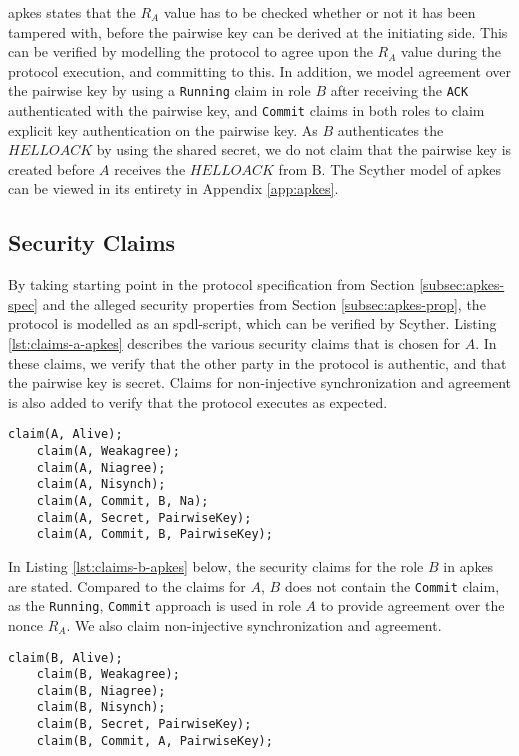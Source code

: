 \gls{apkes} states that the $R_A$ value has to be checked whether or not it has been tampered with, before the pairwise key can be derived at the initiating side. This can be verified by modelling the protocol to agree upon the $R_A$ value during the protocol execution, and committing to this. In addition, we model agreement over the pairwise key by using a \texttt{Running} claim in role $B$ after receiving the \texttt{ACK} authenticated with the pairwise key, and \texttt{Commit} claims in both roles to claim explicit key authentication on the pairwise key. As $B$ authenticates the $HELLOACK$ by using the shared secret, we do not claim that the pairwise key is created before $A$ receives the $HELLOACK$ from B. The Scyther model of \gls{apkes} can be viewed in its entirety in Appendix \ref{app:apkes}.

\subsection{Security Claims}

By taking starting point in the protocol specification from Section \ref{subsec:apkes-spec} and the alleged security properties from Section \ref{subsec:apkes-prop}, the protocol is modelled as an \gls{spdl}-script, which can be verified by Scyther. Listing \ref{lst:claims-a-apkes} describes the various security claims that is chosen for $A$. In these claims, we verify that the other party in the protocol is authentic, and that the pairwise key is secret. Claims for non-injective synchronization and agreement is also added to verify that the protocol executes as expected.

\begin{lstlisting}[caption={Security claims for role A in APKES.}, label={lst:claims-a-apkes}]
	claim(A, Alive);
	claim(A, Weakagree);
	claim(A, Niagree);
	claim(A, Nisynch);
	claim(A, Commit, B, Na);
	claim(A, Secret, PairwiseKey);
	claim(A, Commit, B, PairwiseKey);
\end{lstlisting}

In Listing \ref{lst:claims-b-apkes} below, the security claims for the role $B$ in \gls{apkes} are stated. Compared to the claims for $A$, $B$ does not contain the \texttt{Commit} claim, as the \texttt{Running}, \texttt{Commit} approach is used in role $A$ to provide agreement over the nonce $R_A$. We also claim non-injective synchronization and agreement.

\begin{lstlisting}[caption={Security claims for role B in APKES.}, label={lst:claims-b-apkes}]
	claim(B, Alive);
	claim(B, Weakagree);
	claim(B, Niagree);
	claim(B, Nisynch);
	claim(B, Secret, PairwiseKey);
	claim(B, Commit, A, PairwiseKey);
\end{lstlisting}



